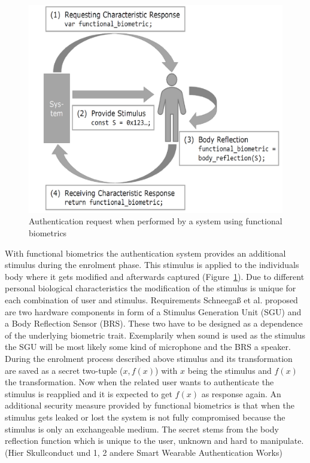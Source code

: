 \begin{figure}[ht]
\begin{minipage}[h]{.45\linewidth}
		\includegraphics[width=\textwidth]{biometric_funct.png}
		\caption{Authentication request when performed by a system using functional biometrics}
		\label{fig:functBiom}
	\end{minipage}
\end{figure}
\newline
With functional biometrics the authentication system provides an additional stimulus during the enrolment phase. This stimulus is applied to the individuals body where it gets modified and afterwards captured (Figure~\ref{fig:functBiom}).
Due to different personal biological characteristics the modification of the stimulus is unique for each combination of user and stimulus.\newline
Requirements Schneegaß et al. proposed are two hardware components in form of a Stimulus Generation Unit (SGU) and a Body Reflection Sensor (BRS). These two have to be designed as a dependence of the underlying biometric trait. Exemplarily when sound is used as the stimulus the SGU will be most likely some kind of microphone and the BRS a speaker.\newpage\noindent
During the enrolment process described above stimulus and its transformation are saved as a secret two-tuple ($x, f(x)$) with $ x $ being the stimulus and $ f(x) $ the transformation. Now when the related user wants to authenticate the stimulus is reapplied and it is expected to get $f(x)$ as response again. An additional security measure provided by functional biometrics is that when the stimulus gets leaked or lost the system is not fully compromised because the stimulus is only an exchangeable medium. The secret stems from the body reflection function which is unique to the user, unknown and hard to manipulate.
\newline\newline
(Hier Skullconduct und 1, 2 andere Smart Wearable Authentication Works)
